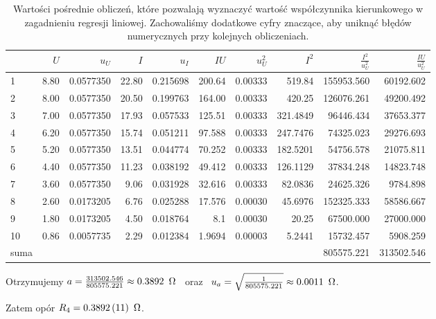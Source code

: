 \documentclass[a4paper]{article}
\begin{document}
\begin{table}
\centering
\begin{tabular}{lrrrrrrrrr}
\toprule
{} &  $U$  &    $u_U$  &     $I$ &    $u_I$   &    $IU$  &    $u_U^2$ &   $I^2$ &    $\frac{I^2}{u_U^2}$ & $\frac{IU}{u_U^2}$ \\
\midrule
1  &  8.80 &  0.0577350 &  22.80 &  0.215698  & 200.64   &  0.00333 &  519.84    & 155953.560  & 60192.602 \\
2  &  8.00 &  0.0577350 &  20.50 &  0.199763  & 164.00   &  0.00333 &  420.25    & 126076.261  & 49200.492 \\
3  &  7.00 &  0.0577350 &  17.93 &  0.057533  & 125.51   &  0.00333 &  321.4849  &  96446.434  & 37653.377 \\
4  &  6.20 &  0.0577350 &  15.74 &  0.051211  &  97.588  &  0.00333 &  247.7476  &  74325.023  & 29276.693 \\
5  &  5.20 &  0.0577350 &  13.51 &  0.044774  &  70.252  &  0.00333 &  182.5201  &  54756.578  & 21075.811 \\
6  &  4.40 &  0.0577350 &  11.23 &  0.038192  &  49.412  &  0.00333 &  126.1129  &  37834.248  & 14823.748 \\
7  &  3.60 &  0.0577350 &   9.06 &  0.031928  &  32.616  &  0.00333 &   82.0836  &  24625.326  &  9784.898 \\
8  &  2.60 &  0.0173205 &   6.76 &  0.025288  &  17.576  &  0.00030 &   45.6976  & 152325.333  & 58586.667 \\
9  &  1.80 &  0.0173205 &   4.50 &  0.018764  &   8.1    &  0.00030 &   20.25    &  67500.000  & 27000.000 \\
10 &  0.86 &  0.0057735 &   2.29 &  0.012384  &   1.9694 &  0.00003 &    5.2441  &  15732.457  &  5908.259 \\
\midrule
	suma & {} & {} & {} & {} & {} & {} & {} & 805575.221 & 313502.546 \\
\bottomrule
\end{tabular}
\caption{Wartości pośrednie obliczeń, które pozwalają wyznaczyć wartość współczynnika kierunkowego w zagadnieniu regresji liniowej. Zachowaliśmy dodatkowe cyfry znaczące, aby uniknąć błędów numerycznych przy kolejnych obliczeniach.}
\end{table}

Otrzymujemy $a = \frac{313502.546}{805575.221} \approx 0.3892 \enskip \Omega \enskip $ oraz $\enskip u_a = \sqrt{\frac{1}{805575.221}} \approx 0.0011 \enskip \Omega$.

Zatem opór $R_4 = 0.3892 \, (11) \enskip \Omega$.
\end{document}
